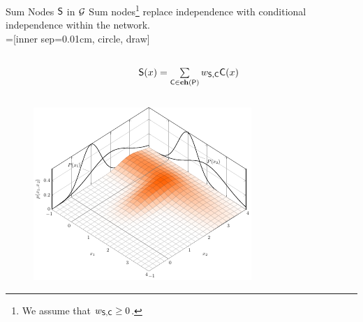 \begin{frame}{Sum Nodes $\mathsf{S}$ in $\mathcal{G}$}
Sum nodes\footnote{\scriptsize We assume that $w_{\mathsf{S}, \mathsf{C}} \geq 0$.} replace independence with conditional independence within the network.\\[1em]

=[inner sep=0.01cm, circle, draw]
\begin{columns}
\begin{column}{.2\linewidth}
\end{column}
\begin{column}{.2\linewidth}
\end{column}
\begin{column}{.4\linewidth}
$\mathsf{S}(x)  = \sum\limits_{\mathsf{C} \in \mathbf{ch}(\mathsf{P})}  w_{\mathsf{S}, \mathsf{C}}\mathsf{C}(x)$
\end{column}
\begin{column}{.2\linewidth}
\end{column}
\end{columns}

\centering
\begin{figure}
\includegraphics{sum_distribution}
\end{figure}
\end{frame}

